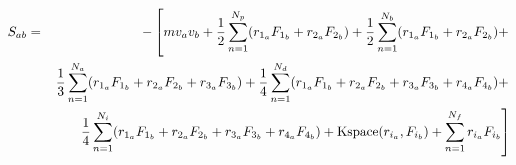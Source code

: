 \documentclass[12pt]{article}
\begin{document}
\begin{eqnarray*}
S_{ab} & = & - \left[ m v_a v_b + 
   \frac{1}{2} \sum_{n = 1}^{N_p} (r_{1_a} F_{1_b} + r_{2_a} F_{2_b}) +
   \frac{1}{2} \sum_{n = 1}^{N_b} (r_{1_a} F_{1_b} + r_{2_a} F_{2_b}) + \right. \\
&& \left. \frac{1}{3} \sum_{n = 1}^{N_a} (r_{1_a} F_{1_b} + r_{2_a} F_{2_b} + 
                                           r_{3_a} F_{3_b}) + 
   \frac{1}{4} \sum_{n = 1}^{N_d} (r_{1_a} F_{1_b} + r_{2_a} F_{2_b} + 
				   r_{3_a} F_{3_b} + r_{4_a} F_{4_b}) + \right. \\
&& \left. \frac{1}{4} \sum_{n = 1}^{N_i} (r_{1_a} F_{1_b} + r_{2_a} F_{2_b} + 
                                          r_{3_a} F_{3_b} + r_{4_a} F_{4_b}) +
   {\rm Kspace}(r_{i_a},F_{i_b}) + 
   \sum_{n = 1}^{N_f} r_{i_a} F_{i_b} \right]
\end{eqnarray*}
\end{document}
